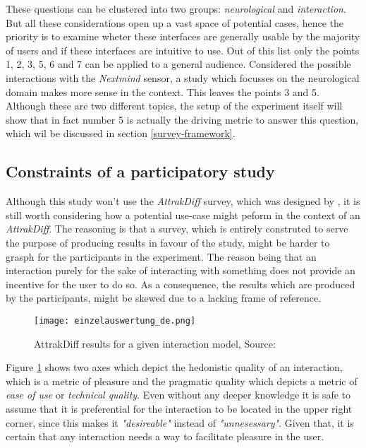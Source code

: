                 These questions can be clustered into two groups: \textit{neurological} and \textit{interaction}. But all these considerations open up a vast space of potential cases, hence the priority is to examine wheter these interfaces are generally usable by the majority of users and if these interfaces are intuitive to use. Out of this list only the points 1, 2, 3, 5, 6 and 7 can be applied to a general audience. Considered the possible interactions with the \textit{Nextmind} sensor, a study which focusses on the neurological domain makes more sense in the context. This leaves the points 3 and 5. Although these are two different topics, the setup of the experiment itself will show that in fact number 5 is actually the driving metric to answer this question, which wil be discussed in section \ref*{survey-framework}.

            \subsection{Constraints of a participatory study}
            
                Although this study won't use the \textit{AttrakDiff} survey, which was designed by \cite{Hassenzahl.30092020}, it is still worth considering how a potential use-case might peform in the context of an \textit{AttrakDiff}. The reasoning is that a survey, which is entirely construted to serve the purpose of producing results in favour of the study, might be harder to grasph for the participants in the experiment. The reason being that an interaction purely for the sake of interacting with something does not provide an incentive for the user to do so. As a consequence, the results which are produced by the participants, might be skewed due to a lacking frame of reference.

                \begin{figure}[h]     %
                    \centering
                    \texttt{[image: einzelauswertung\_de.png]} 
                    \caption{ AttrakDiff results for a given interaction model, Source: \cite{Hassenzahl.30092020}}\label{AttrakDiff}
                \end{figure}

                Figure \ref*{AttrakDiff} shows two axes which depict the hedonistic quality of an interaction, which is a metric of pleasure and the pragmatic quality which depicts a metric of \textit{ease of use} or \textit{technical quality}. Even without any deeper knowledge it is safe to assume that it is preferential for the interaction to be located in the upper right corner, since this makes it \textit{"desireable"} instead of \textit{"unnesessary"}. Given that, it is certain that any interaction needs a way to facilitate pleasure in the user.

